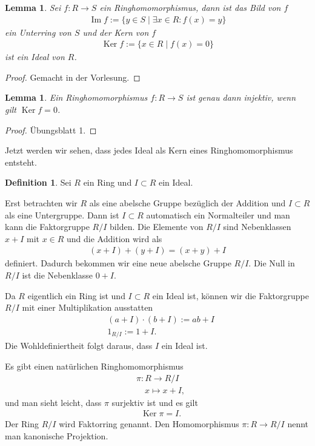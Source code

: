 \documentclass[reqno,12pt]{article}
\numberwithin{equation}{section}
\newcommand{\Ker}{\text{Ker }}
\renewcommand{\Im}{\text{Im }}
\theoremstyle{plain}
\newtheorem{lemma}[thm]{Lemma}
\theoremstyle{definition}
\newtheorem{definition}[thm]{Definition}
\renewcommand{\Ker}{\operatorname{Ker}}
\renewcommand{\Im}{\operatorname{Im}}
\begin{document}
\begin{lemma}
Sei $f \colon R \to S$ ein Ringhomomorphismus, dann ist das {\sf Bild} von $f$
\begin{align*}
  \Im f := \{y \in S \mid \exists x \in R \colon f(x)=y \}
\end{align*}
ein Unterring von $S$ und der {\sf Kern} von $f$
\begin{align*}
  \Ker f := \{x \in R \mid  f(x)=0 \}
\end{align*}
ist ein Ideal von $R$.
\end{lemma}

\begin{proof}
Gemacht in der Vorlesung.
\end{proof}

\begin{lemma}
Ein Ringhomomorphismus $f \colon R \to S$ ist genau dann injektiv, wenn gilt $\Ker f =0$.
\end{lemma}

\begin{proof}
Übungsblatt 1.
\end{proof}



Jetzt werden wir sehen, dass jedes Ideal als Kern eines Ringhomomorphismus entsteht.

\begin{definition}
Sei $R$ ein Ring und $I \subset R$ ein Ideal.

Erst betrachten wir $R$ als eine abelsche Gruppe bezüglich der Addition und $I \subset R$ als eine Untergruppe. Dann ist $I \subset R$ automatisch ein Normalteiler und man kann die Faktorgruppe $R/I$ bilden. Die Elemente von $R/I$ sind Nebenklassen $x+I$ mit $x \in R$ und die Addition wird als
\begin{align*}
  (x+I) + (y+I) = (x+y) + I
\end{align*}
definiert. Dadurch bekommen wir eine neue abelsche Gruppe $R/I$. Die Null in $R/I$ ist die Nebenklasse $0+I$.

Da $R$ eigentlich ein Ring ist und $I \subset R$ ein Ideal ist, können wir die Faktorgruppe $R/I$ mit einer Multiplikation ausstatten
\begin{align*}
& (a + I) \cdot (b + I) := ab + I \\
& 1_{R/I} := 1 + I.
\end{align*}
Die Wohldefiniertheit folgt daraus, dass $I$ ein Ideal ist.

Es gibt einen natürlichen Ringhomomorphismus
\begin{align*}
&  \pi \colon R \to R/I \\
& \quad  x \mapsto x + I,
\end{align*}
und man sieht leicht, dass $\pi$ surjektiv ist und es gilt
\begin{align*}
&  \Ker \pi = I.
\end{align*}
Der Ring $R/I$ wird {\sf Faktorring} genannt. Den Homomorphismus $\pi \colon R \to R/I$ nennt man {\sf kanonische Projektion}.
\end{definition}
\end{document}
